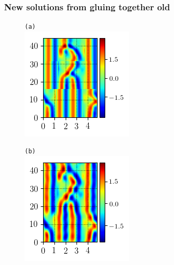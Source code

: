 \documentclass[mathserif, handout]{beamer}
\begin{document}
\begin{frame}
\frametitle{New solutions from gluing together old}
\begin{figure}
\begin{minipage}[height=.30\textheight]{.6\textwidth}
\centering \small{\texttt{(a)}}\\
\includegraphics[width=.3\textwidth,height=.3\textheight]{MNG_ppo_tiling_init_pretruncation_1}
\end{minipage}
\begin{minipage}[height=.30\textheight]{.6\textwidth}
\centering \small{\texttt{(b)}}\\
\includegraphics[width=.3\textwidth,height=.3\textheight]{MNG_ppo_tiling_init_1}
\end{minipage}
\end{figure}
\end{frame}
\end{document}
